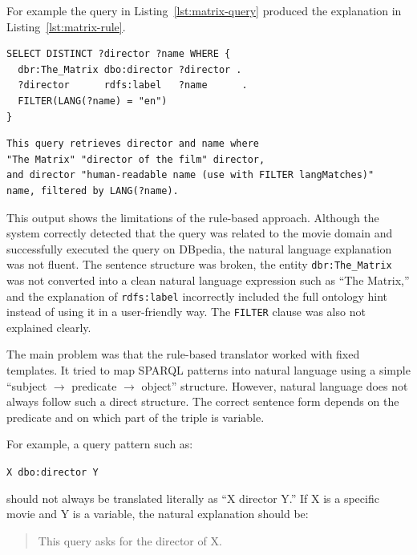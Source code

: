 \documentclass[11pt,a4paper]{article}
\begin{document}
For example the query in Listing~\ref{lst:matrix-query} produced the explanation in
Listing~\ref{lst:matrix-rule}.

\begin{lstlisting}[style=sparqlStyle, caption={A test query about
the director of \emph{The Matrix} used to evaluate the rule-based
verbaliser.}, label={lst:matrix-query}]
SELECT DISTINCT ?director ?name WHERE {
  dbr:The_Matrix dbo:director ?director .
  ?director      rdfs:label   ?name      .
  FILTER(LANG(?name) = "en")
}
\end{lstlisting}

\begin{lstlisting}[style=plainStyle, caption={Rule-based output:
structurally grounded but not readable.},
label={lst:matrix-rule}]
This query retrieves director and name where
"The Matrix" "director of the film" director,
and director "human-readable name (use with FILTER langMatches)"
name, filtered by LANG(?name).
\end{lstlisting}

This output shows the limitations of the rule-based approach. Although the system correctly detected that the query was related to the movie domain and successfully executed the query on DBpedia, the natural language explanation was not fluent. The sentence structure was broken, the entity \texttt{dbr:The\_Matrix} was not converted into a clean natural language expression such as ``The Matrix,'' and the explanation of \texttt{rdfs:label} incorrectly included the full ontology hint instead of using it in a user-friendly way. The \texttt{FILTER} clause was also not explained clearly.

The main problem was that the rule-based translator worked with fixed templates. It tried to map SPARQL patterns into natural language using a simple ``subject $\rightarrow$ predicate $\rightarrow$ object'' structure. However, natural language does not always follow such a direct structure. The correct sentence form depends on the predicate and on which part of the triple is variable.

For example, a query pattern such as:

\begin{center}
\texttt{X dbo:director Y}
\end{center}

should not always be translated literally as ``X director Y.'' If X is a specific movie and Y is a variable, the natural explanation should be:

\begin{quote}
This query asks for the director of X.
\end{quote}
\end{document}
